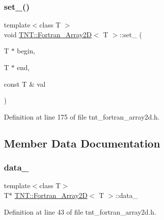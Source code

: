 \subsubsection{\texorpdfstring{set\+\_\+()}{set\_()}}
{\footnotesize\ttfamily template$<$class T $>$ \\
void \hyperlink{classTNT_1_1Fortran__Array2D}{T\+N\+T\+::\+Fortran\+\_\+\+Array2D}$<$ T $>$\+::set\+\_\+ (\begin{DoxyParamCaption}\item[{T $\ast$}]{begin,  }\item[{T $\ast$}]{end,  }\item[{const T \&}]{val }\end{DoxyParamCaption})\hspace{0.3cm}{\ttfamily [private]}}



Definition at line 175 of file tnt\+\_\+fortran\+\_\+array2d.\+h.



\subsection{Member Data Documentation}
\mbox{\label{classTNT_1_1Fortran__Array2D_a227b8df79bc227c837717f3f112ef72e}} 
\subsubsection{\texorpdfstring{data\+\_\+}{data\_}}
{\footnotesize\ttfamily template$<$class T$>$ \\
T$\ast$ \hyperlink{classTNT_1_1Fortran__Array2D}{T\+N\+T\+::\+Fortran\+\_\+\+Array2D}$<$ T $>$\+::data\+\_\+\hspace{0.3cm}{\ttfamily [private]}}



Definition at line 43 of file tnt\+\_\+fortran\+\_\+array2d.\+h.

\mbox{\label{classTNT_1_1Fortran__Array2D_ab3f53a5ab63db57a130fb2f7e971d559}} 
